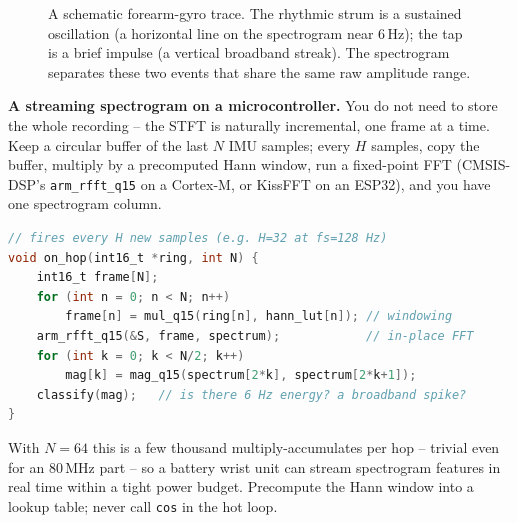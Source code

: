 \begin{figure}[H]
\centering
{}
\caption{A schematic forearm-gyro trace. The rhythmic strum is a sustained
oscillation (a horizontal line on the spectrogram near 6\,Hz); the tap is a brief
impulse (a vertical broadband streak). The spectrogram separates these two events
that share the same raw amplitude range.}
\label{ch10:fig-imu}
\end{figure}

\begin{buildbox}
\textbf{A streaming spectrogram on a microcontroller.} You do not need to store
the whole recording -- the STFT is naturally incremental, one frame at a time.
Keep a circular buffer of the last $N$ IMU samples; every $H$ samples, copy the
buffer, multiply by a precomputed Hann window, run a fixed-point FFT (CMSIS-DSP's
\texttt{arm\_rfft\_q15} on a Cortex-M, or KissFFT on an ESP32), and you have one
spectrogram column.
\begin{lstlisting}[language=C]
// fires every H new samples (e.g. H=32 at fs=128 Hz)
void on_hop(int16_t *ring, int N) {
    int16_t frame[N];
    for (int n = 0; n < N; n++)
        frame[n] = mul_q15(ring[n], hann_lut[n]); // windowing
    arm_rfft_q15(&S, frame, spectrum);            // in-place FFT
    for (int k = 0; k < N/2; k++)
        mag[k] = mag_q15(spectrum[2*k], spectrum[2*k+1]);
    classify(mag);   // is there 6 Hz energy? a broadband spike?
}
\end{lstlisting}
With $N = 64$ this is a few thousand multiply-accumulates per hop -- trivial even
for an 80\,MHz part -- so a battery wrist unit can stream spectrogram features in
real time within a tight power budget. Precompute the Hann window into a lookup
table; never call \texttt{cos} in the hot loop.
\end{buildbox}

